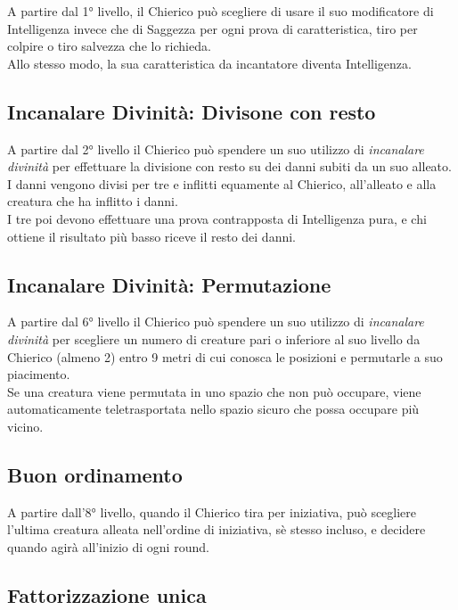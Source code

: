 A partire dal 1° livello, il Chierico può scegliere di usare il suo modificatore di Intelligenza invece che di Saggezza per ogni prova di caratteristica, tiro per colpire o tiro salvezza che lo richieda.\\ Allo stesso modo, la sua caratteristica da incantatore diventa Intelligenza.

\subsection{Incanalare Divinità: Divisone con resto}

A partire dal 2° livello il Chierico può spendere un suo utilizzo di \textit{incanalare divinità} per effettuare la divisione con resto su dei danni subiti da un suo alleato. \\ I danni vengono divisi per tre e inflitti equamente al Chierico, all'alleato e alla creatura che ha inflitto i danni. \\ I tre poi devono effettuare una prova contrapposta di Intelligenza pura, e chi ottiene il risultato più basso riceve il resto dei danni.

\subsection{Incanalare Divinità: Permutazione}

A partire dal 6° livello il Chierico può spendere un suo utilizzo di \textit{incanalare divinità} per scegliere un numero di creature pari o inferiore al suo livello da Chierico (almeno 2) entro 9 metri di cui conosca le posizioni e permutarle a suo piacimento. \\ Se una creatura viene permutata in uno spazio che non può occupare, viene automaticamente teletrasportata nello spazio sicuro che possa occupare più vicino.

\subsection{Buon ordinamento}

A partire dall'8° livello, quando il Chierico tira per iniziativa, può scegliere l'ultima creatura alleata nell'ordine di iniziativa, sè stesso incluso, e decidere quando agirà all'inizio di ogni round.

\subsection{Fattorizzazione unica}

